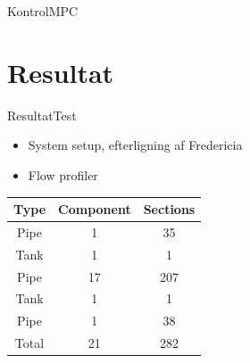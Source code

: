 \begin{frame}{Kontrol}{MPC}
\vspace{-6mm}
	 \begin{figure}
	 \centering
	 
	\label{fig:MPC_test_output_second_test_with_constraints}
	\end{figure}   
\vspace{-8mm}
	 \begin{figure}
	 \centering
	 
	\label{fig:tank_height_second_test_with_constraints}
	\end{figure} 


\end{frame}



\section{Resultat}

\begin{frame}{Resultat}{Test}
	\vfill \vfill\centering
	\begin{minipage}[t]{0.48\linewidth}
	\begin{itemize}
		   	\item System setup, efterligning af Fredericia
		   	\item Flow profiler 
	\end{itemize}    
	\end{minipage}\hfill
	\begin{minipage}[t]{0.48\linewidth}
	\begin{table}[H]
	\centering
	\begin{tabular}{|c|c|c|}
	\hline
		\rowcolor[HTML]{9B9B9B} 
	Type  & Component & Sections \\ \hline
	Pipe  & 1         & 35       \\ \hline
	Tank  & 1         & 1        \\ \hline
	Pipe  & 17        & 207      \\ \hline
	Tank  & 1         & 1        \\ \hline
	Pipe  & 1         & 38        \\ \hline
	Total & 21        & 282      \\ \hline
	\end{tabular}
	\label{tab:system_setup_nonlinear_linear_testv2}
	\end{table}
	\end{minipage}

	\vfill \vfill

\end{frame}

